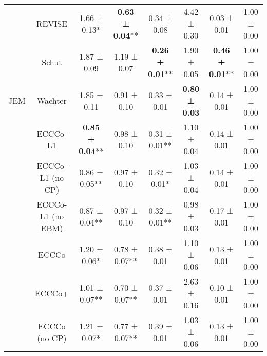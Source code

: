\begin{table}
{\begin{tabular}[t]{cccccccc}
 & REVISE & 1.66 ± 0.13*\hphantom{*} & \textbf{0.63 ± 0.04}** & 0.34 ± 0.08\hphantom{*}\hphantom{*} & 4.42 ± 0.30\hphantom{*}\hphantom{*} & 0.03 ± 0.01\hphantom{*}\hphantom{*} & 1.00 ± 0.00\hphantom{*}\hphantom{*}\\

 & Schut & 1.87 ± 0.09\hphantom{*}\hphantom{*} & 1.19 ± 0.07\hphantom{*}\hphantom{*} & \textbf{0.26 ± 0.01}** & 1.90 ± 0.05\hphantom{*}\hphantom{*} & \textbf{0.46 ± 0.01}** & 1.00 ± 0.00\hphantom{*}\hphantom{*}\\

\multirow[t]{-10}{*}{\centering\arraybackslash JEM} & Wachter & 1.85 ± 0.11\hphantom{*}\hphantom{*} & 0.91 ± 0.10\hphantom{*}\hphantom{*} & 0.33 ± 0.01\hphantom{*}\hphantom{*} & \textbf{0.80 ± 0.03}\hphantom{*}\hphantom{*} & 0.14 ± 0.01\hphantom{*}\hphantom{*} & 1.00 ± 0.00\hphantom{*}\hphantom{*}\\
\cmidrule{1-8}
 & ECCCo-L1 & \textbf{0.85 ± 0.04}** & 0.98 ± 0.10\hphantom{*}\hphantom{*} & 0.31 ± 0.01** & 1.10 ± 0.04\hphantom{*}\hphantom{*} & 0.14 ± 0.01\hphantom{*}\hphantom{*} & 1.00 ± 0.00\hphantom{*}\hphantom{*}\\

 & ECCCo-L1 (no CP) & 0.86 ± 0.05** & 0.97 ± 0.10\hphantom{*}\hphantom{*} & 0.32 ± 0.01*\hphantom{*} & 1.03 ± 0.04\hphantom{*}\hphantom{*} & 0.14 ± 0.01\hphantom{*}\hphantom{*} & 1.00 ± 0.00\hphantom{*}\hphantom{*}\\

 & ECCCo-L1 (no EBM) & 0.87 ± 0.04** & 0.97 ± 0.10\hphantom{*}\hphantom{*} & 0.32 ± 0.01** & 0.98 ± 0.03\hphantom{*}\hphantom{*} & 0.17 ± 0.01\hphantom{*}\hphantom{*} & 1.00 ± 0.00\hphantom{*}\hphantom{*}\\

 & ECCCo & 1.20 ± 0.06*\hphantom{*} & 0.78 ± 0.07** & 0.38 ± 0.01\hphantom{*}\hphantom{*} & 1.10 ± 0.06\hphantom{*}\hphantom{*} & 0.13 ± 0.01\hphantom{*}\hphantom{*} & 1.00 ± 0.00\hphantom{*}\hphantom{*}\\

 & ECCCo+ & 1.01 ± 0.07** & 0.70 ± 0.07** & 0.37 ± 0.01\hphantom{*}\hphantom{*} & 2.63 ± 0.16\hphantom{*}\hphantom{*} & 0.10 ± 0.01\hphantom{*}\hphantom{*} & 1.00 ± 0.00\hphantom{*}\hphantom{*}\\

 & ECCCo (no CP) & 1.21 ± 0.07*\hphantom{*} & 0.77 ± 0.07** & 0.39 ± 0.01\hphantom{*}\hphantom{*} & 1.03 ± 0.06\hphantom{*}\hphantom{*} & 0.13 ± 0.01\hphantom{*}\hphantom{*} & 1.00 ± 0.00\hphantom{*}\hphantom{*}\\


\end{tabular}}
\end{table}
